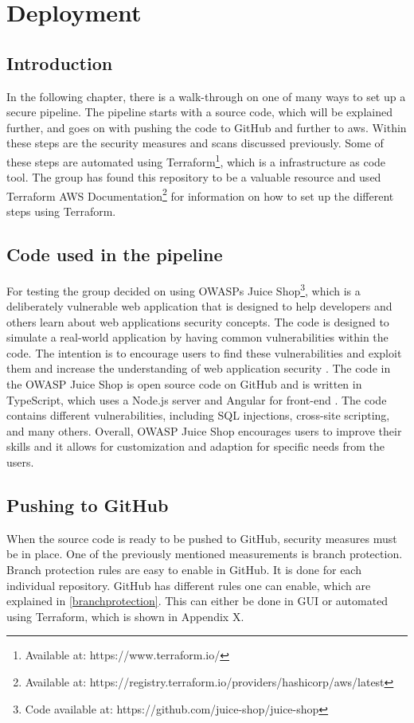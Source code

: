 \chapter{Deployment}
\label{Deployment}
\section{Introduction}
In the following chapter, there is a walk-through on one of many ways to set up a secure pipeline. The pipeline starts with a source code, which will be explained further, and goes on with pushing the code to GitHub and further to \acrshort{aws}. Within these steps are the security measures and scans discussed previously. Some of these steps are automated using Terraform\footnote{Available at: https://www.terraform.io/}, which is a \gls{infrastructure as code} tool. The group has found this repository to be a valuable resource \cite{aws-cicd-pipeline} and used Terraform AWS Documentation\footnote{Available at: https://registry.terraform.io/providers/hashicorp/aws/latest} for information on how to set up the different steps using Terraform. 

\section{Code used in the pipeline}
For testing the group decided on using OWASPs Juice Shop\footnote{Code available at: https://github.com/juice-shop/juice-shop}, which is a deliberately vulnerable web application that is designed to help developers and others learn about web applications security concepts. The code is designed to simulate a real-world application by having common vulnerabilities within the code. The intention is to encourage users to find these vulnerabilities and exploit them and increase the understanding of web application security \cite{owaspJuiceShop}.
The code in the OWASP Juice Shop is open source code on GitHub and is written in TypeScript, which uses a Node.js server and Angular for \gls{front-end} \cite{owaspJuiceShopCode}.
The code contains different vulnerabilities, including SQL injections, cross-site scripting, and many others. 
Overall, OWASP Juice Shop encourages users to improve their skills and it allows for customization and adaption for specific needs from the users. 

\section{Pushing to GitHub}
When the source code is ready to be pushed to GitHub, security measures must be in place. One of the previously mentioned measurements is branch protection. Branch protection rules are easy to enable in GitHub. It is done for each individual repository. GitHub has different rules one can enable, which are explained in \ref{branchprotection}. This can either be done in \gls{GUI} or automated using Terraform, which is shown in Appendix X. 

